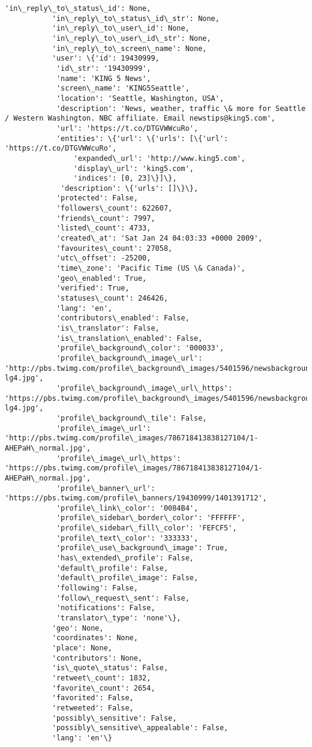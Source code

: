 \documentclass[11pt]{article}
\begin{document}
\begin{Verbatim}[commandchars=\\\{\}]
           'in\_reply\_to\_status\_id': None,
           'in\_reply\_to\_status\_id\_str': None,
           'in\_reply\_to\_user\_id': None,
           'in\_reply\_to\_user\_id\_str': None,
           'in\_reply\_to\_screen\_name': None,
           'user': \{'id': 19430999,
            'id\_str': '19430999',
            'name': 'KING 5 News',
            'screen\_name': 'KING5Seattle',
            'location': 'Seattle, Washington, USA',
            'description': 'News, weather, traffic \& more for Seattle / Western Washington. NBC affiliate. Email newstips@king5.com',
            'url': 'https://t.co/DTGVWWcuRo',
            'entities': \{'url': \{'urls': [\{'url': 'https://t.co/DTGVWWcuRo',
                'expanded\_url': 'http://www.king5.com',
                'display\_url': 'king5.com',
                'indices': [0, 23]\}]\},
             'description': \{'urls': []\}\},
            'protected': False,
            'followers\_count': 622607,
            'friends\_count': 7997,
            'listed\_count': 4733,
            'created\_at': 'Sat Jan 24 04:03:33 +0000 2009',
            'favourites\_count': 27058,
            'utc\_offset': -25200,
            'time\_zone': 'Pacific Time (US \& Canada)',
            'geo\_enabled': True,
            'verified': True,
            'statuses\_count': 246426,
            'lang': 'en',
            'contributors\_enabled': False,
            'is\_translator': False,
            'is\_translation\_enabled': False,
            'profile\_background\_color': '000033',
            'profile\_background\_image\_url': 'http://pbs.twimg.com/profile\_background\_images/5401596/newsbackgroundhd-lg4.jpg',
            'profile\_background\_image\_url\_https': 'https://pbs.twimg.com/profile\_background\_images/5401596/newsbackgroundhd-lg4.jpg',
            'profile\_background\_tile': False,
            'profile\_image\_url': 'http://pbs.twimg.com/profile\_images/786718413838127104/1-AHEPaH\_normal.jpg',
            'profile\_image\_url\_https': 'https://pbs.twimg.com/profile\_images/786718413838127104/1-AHEPaH\_normal.jpg',
            'profile\_banner\_url': 'https://pbs.twimg.com/profile\_banners/19430999/1401391712',
            'profile\_link\_color': '0084B4',
            'profile\_sidebar\_border\_color': 'FFFFFF',
            'profile\_sidebar\_fill\_color': 'FEFCF5',
            'profile\_text\_color': '333333',
            'profile\_use\_background\_image': True,
            'has\_extended\_profile': False,
            'default\_profile': False,
            'default\_profile\_image': False,
            'following': False,
            'follow\_request\_sent': False,
            'notifications': False,
            'translator\_type': 'none'\},
           'geo': None,
           'coordinates': None,
           'place': None,
           'contributors': None,
           'is\_quote\_status': False,
           'retweet\_count': 1832,
           'favorite\_count': 2654,
           'favorited': False,
           'retweeted': False,
           'possibly\_sensitive': False,
           'possibly\_sensitive\_appealable': False,
           'lang': 'en'\}
\end{Verbatim}
            
\end{document}
